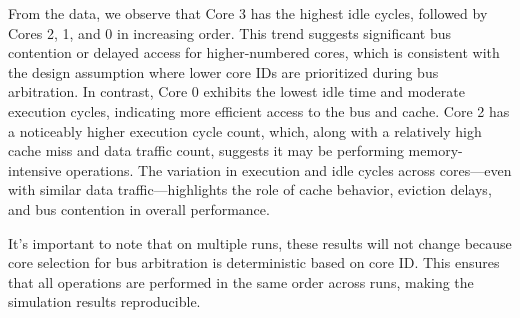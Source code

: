 \documentclass[a4paper,12pt]{article}
\begin{document}
From the data, we observe that Core 3 has the highest idle cycles, followed by Cores 2, 1, and 0 in increasing order. This trend suggests significant bus contention or delayed access for higher-numbered cores, which is consistent with the design assumption where lower core IDs are prioritized during bus arbitration. In contrast, Core 0 exhibits the lowest idle time and moderate execution cycles, indicating more efficient access to the bus and cache. Core 2 has a noticeably higher execution cycle count, which, along with a relatively high cache miss and data traffic count, suggests it may be performing memory-intensive operations. The variation in execution and idle cycles across cores—even with similar data traffic—highlights the role of cache behavior, eviction delays, and bus contention in overall performance.

It's important to note that on multiple runs, these results will not change because core selection for bus arbitration is deterministic based on core ID. This ensures that all operations are performed in the same order across runs, making the simulation results reproducible.





            
\end{document}

